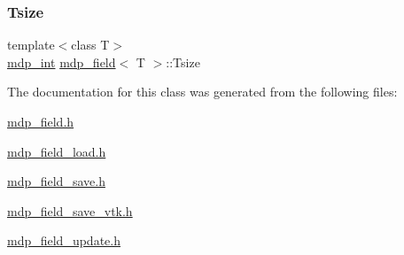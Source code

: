 \mbox{\label{classmdp__field_aece7eeb6754c5e2ec9f031e352eb6f1f}} 
\subsubsection{\texorpdfstring{Tsize}{Tsize}}
{\footnotesize\ttfamily template$<$class T$>$ \\
\hyperlink{mdp__global__vars_8h_aaa1ad9d0dcd2124aa5af0120d9954174}{mdp\+\_\+int} \hyperlink{classmdp__field}{mdp\+\_\+field}$<$ T $>$\+::Tsize\hspace{0.3cm}{\ttfamily [protected]}}



The documentation for this class was generated from the following files\+:\begin{DoxyCompactItemize}
\item 
\hyperlink{mdp__field_8h}{mdp\+\_\+field.\+h}\item 
\hyperlink{mdp__field__load_8h}{mdp\+\_\+field\+\_\+load.\+h}\item 
\hyperlink{mdp__field__save_8h}{mdp\+\_\+field\+\_\+save.\+h}\item 
\hyperlink{mdp__field__save__vtk_8h}{mdp\+\_\+field\+\_\+save\+\_\+vtk.\+h}\item 
\hyperlink{mdp__field__update_8h}{mdp\+\_\+field\+\_\+update.\+h}\end{DoxyCompactItemize}
